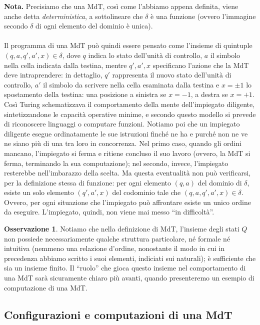 \documentclass[12pt,a4paper]{report}
\theoremstyle{definition}
\newtheorem{oss}[teo]{Osservazione}  %
\begin{document}
\noindent \textbf{Nota.} Precisiamo che una MdT, così come l'abbiamo appena definita, viene anche detta \emph{deterministica}, a sottolineare che $\delta$ è una funzione (ovvero l'immagine secondo $\delta$ di ogni elemento del dominio è unica).\\
\\
Il programma di una MdT può quindi essere pensato come l'insieme di quintuple $(q,a,q',a',x) \in \delta$, dove $q$ indica lo stato dell'unità di controllo, $a$ il simbolo nella cella indicata dalla testina, mentre $q', a', x$ specificano l'azione che la MdT deve intraprendere: in dettaglio, $q'$ rappresenta il nuovo stato dell'unità di controllo, $a'$ il simbolo da scrivere nella cella esaminata dalla testina e $x= \pm 1$ lo spostamento della testina: una posizione a sinistra se $x=-1$, a destra se $x=+1$.\\
Così Turing schematizzava il comportamento della mente dell'impiegato diligente, sintetizzandone le capacità operative minime, e secondo questo modello si prevede di riconoscere linguaggi o computare funzioni.
Notiamo poi che un impiegato diligente esegue ordinatamente le sue istruzioni finché ne ha e purché non ne ve ne siano più di una tra loro in concorrenza. Nel primo caso, quando gli ordini mancano, l'impiegato si ferma e ritiene concluso il suo lavoro (ovvero, la MdT si ferma, terminando la sua computazione); nel secondo, invece, l'impiegato resterebbe nell'imbarazzo della scelta. Ma questa eventualità non può verificarsi, per la definizione stessa di funzione: per ogni elemento $(q,a)$ del dominio di $\delta$, esiste un solo elemento $(q',a',x)$ del codominio tale che $(q,a,q',a',x) \in \delta$. Ovvero, per ogni situazione che l'impiegato può affrontare esiste un unico ordine da eseguire. L'impiegato, quindi, non viene mai messo ``in difficoltà''.

\begin{oss}
Notiamo che nella definizione di MdT, l'insieme degli stati $Q$ non possiede necessariamente qualche struttura particolare, né formale né intuitiva (nemmeno una relazione d'ordine, nonostante il modo in cui in precedenza abbiamo scritto i suoi elementi, indiciati sui naturali); è sufficiente che sia un insieme finito. Il ``ruolo'' che gioca questo insieme nel comportamento di una MdT sarà sicuramente chiaro più avanti, quando presenteremo un esempio di computazione di una MdT.
\end{oss}


\subsection{Configurazioni e computazioni di una MdT}
\end{document}
